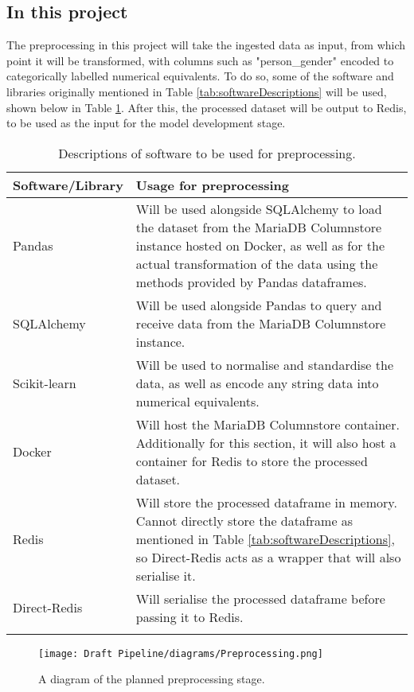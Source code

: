 \subsection{In this project}
The preprocessing in this project will take the ingested data as input, from which point it will be transformed,
with columns such as "person\_gender" encoded to categorically labelled numerical equivalents. To do so, some of the software
and libraries originally mentioned in Table \ref{tab:softwareDescriptions} will be used, shown below in Table \ref{tab:PreprocessingSoftware}.
After this, the processed dataset will be output to Redis, to be used as the input for the model development stage.


\begin{longtable}{ |p{}| p{}|}
    \hline
    \cellcolor{blue!25}Software/Library & \cellcolor{blue!25}Usage for preprocessing\\
    \hline
    Pandas & 
    Will be used alongside SQLAlchemy to load the dataset from the MariaDB Columnstore instance hosted on Docker, 
    as well as for the actual transformation of the data using the methods provided by Pandas dataframes.\\
    \hline
    SQLAlchemy & 
    Will be used alongside Pandas to query and receive data from the MariaDB Columnstore instance.\\
    \hline
    Scikit-learn & 
    Will be used to normalise and standardise the data, as well as encode any string data into numerical 
    equivalents.\\
    \hline
    Docker &
    Will host the MariaDB Columnstore container. Additionally for this section, it will also host a 
    container for Redis to store the processed dataset.\\
    \hline
    Redis &
    Will store the processed dataframe in memory. Cannot directly store the dataframe as mentioned in 
    Table \ref{tab:softwareDescriptions}, so Direct-Redis acts as a wrapper that will also serialise it.\\
    \hline
    Direct-Redis & 
    Will serialise the processed dataframe before passing it to Redis.\\
    \hline
\caption{Descriptions of software to be used for preprocessing.}\label{tab:PreprocessingSoftware}
\end{longtable}

\begin{figure}[H]
    \centering
    \texttt{[image: Draft Pipeline/diagrams/Preprocessing.png]}
    \caption{A diagram of the planned preprocessing stage.}
    \label{fig:PreprocessingDiagram}
\end{figure}


